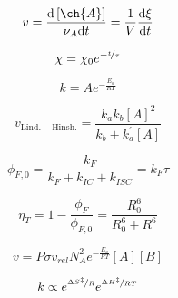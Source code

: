 \documentclass[12pt, letterpaper]{memoir}
\begin{document}
\noindent
\begin{minipage}[t]{0.5\linewidth}
	\begin{equation*}
		v = \frac{\mathrm{d}\left[\ch{A}\right]}{\nu_A\mathrm{d}t}=\dfrac{1}{V}\dfrac{\mathrm{d}\xi}{\mathrm{d}t}
	\end{equation*}

	\begin{equation*}
		\chi = \chi_0e^{-\nicefrac{t}{\tau}}
	\end{equation*}

	\begin{equation*}
		k = Ae^{-\frac{E_a}{RT}}
	\end{equation*}

	\begin{equation*}
		v_{\mathrm{Lind.-Hinsh.}} = \dfrac{k_ak_b[A]^2}{k_b+k^\prime_a[A]}
	\end{equation*}

	\begin{equation*}
		\phi_{F,0}=\dfrac{k_F}{k_F+k_{IC}+k_{ISC}}= k_F\tau
	\end{equation*}

	\begin{equation*}
		\eta_T = 1 - \dfrac{\phi_F}{\phi_{F,0}} = \dfrac{R_0^6}{R_0^6 + R^6}
	\end{equation*}

	\begin{equation*}
		v= P\sigma v_{rel}N_A^2e^{-\frac{E_a}{RT}}[A][B]
	\end{equation*}


	\begin{equation*}
		k\propto e^{\nicefrac{\Delta S^{\ddagger}}{R}}e^{\nicefrac{\Delta H^{\ddagger}}{RT}}
	\end{equation*}
\end{minipage}
\end{document}
